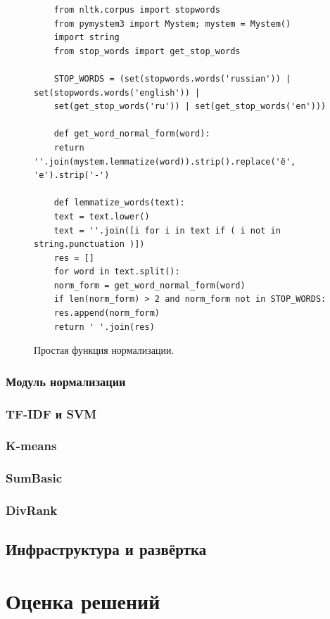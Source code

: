 \documentclass[a4paper, 14pt]{extarticle}
\begin{document}
\begin{figure}
	\centering
	\begin{verbatim}
	from nltk.corpus import stopwords
	from pymystem3 import Mystem; mystem = Mystem()
	import string
	from stop_words import get_stop_words
	
	STOP_WORDS = (set(stopwords.words('russian')) | set(stopwords.words('english')) | 
	set(get_stop_words('ru')) | set(get_stop_words('en')))
	
	def get_word_normal_form(word):
	return ''.join(mystem.lemmatize(word)).strip().replace('ё', 'е').strip('-')
	
	def lemmatize_words(text):
	text = text.lower()
	text = ''.join([i for i in text if ( i not in string.punctuation )])
	res = []
	for word in text.split():
	norm_form = get_word_normal_form(word)
	if len(norm_form) > 2 and norm_form not in STOP_WORDS:
	res.append(norm_form)
	return ' '.join(res)
	\end{verbatim}
	\caption{Простая функция нормализации.}
	\label{norm}
\end{figure}




\subsubsection{Модуль нормализации}
\subsubsection{TF-IDF и SVM}
\subsubsection{K-means}
\subsubsection{SumBasic}
\subsubsection{DivRank}

\subsection{Инфраструктура и развёртка}

\section{Оценка решений}
\end{document}
